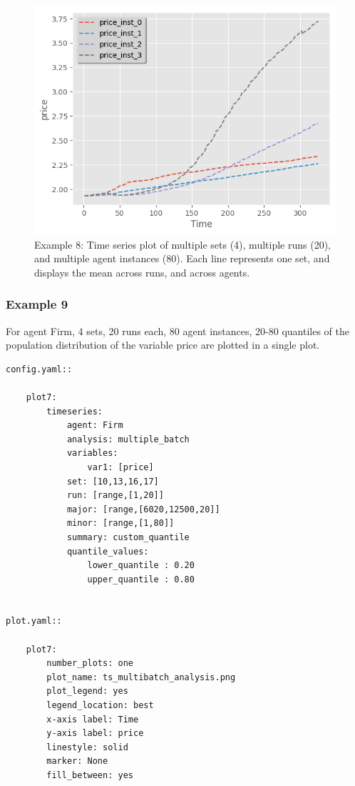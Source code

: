 \documentclass[10pt,a4paper]{article}
\begin{document}
\begin{figure}[b!]\centering\leavevmode
\includegraphics[scale=.6]{./plots_tut_2/P4_ts_price.png}
\caption{\footnotesize  Example 8: Time series plot of multiple sets (4), multiple runs (20), and multiple agent instances (80). Each line represents one set, and displays the mean across runs, and across agents.}
\end{figure}



\clearpage
\subsubsection{Example 9}
For agent Firm, 4 sets, 20 runs each, 80 agent instances, 20-80 quantiles of the population distribution of the variable price are plotted in a single plot.

\begin{lstlisting}
config.yaml::

    plot7:
        timeseries:
            agent: Firm
            analysis: multiple_batch
            variables:
                var1: [price]
            set: [10,13,16,17]
            run: [range,[1,20]]
            major: [range,[6020,12500,20]]
            minor: [range,[1,80]] 
            summary: custom_quantile
            quantile_values:          
                lower_quantile : 0.20
                upper_quantile : 0.80


plot.yaml::

    plot7:
        number_plots: one
        plot_name: ts_multibatch_analysis.png
        plot_legend: yes
        legend_location: best
        x-axis label: Time
        y-axis label: price
        linestyle: solid
        marker: None
        fill_between: yes
\end{lstlisting}
\end{document}
